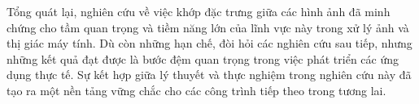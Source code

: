 Tổng quát lại, nghiên cứu về việc khớp đặc trưng giữa các hình ảnh đã minh chứng cho tầm quan trọng và tiềm năng lớn của lĩnh vực này trong xử lý ảnh và thị giác máy tính. Dù còn những hạn chế, đòi hỏi các nghiên cứu sau tiếp, nhưng những kết quả đạt được là bước đệm quan trọng trong việc phát triển các ứng dụng thực tế. Sự kết hợp giữa lý thuyết và thực nghiệm trong nghiên cứu này đã tạo ra một nền tảng vững chắc cho các công trình tiếp theo trong tương lai.